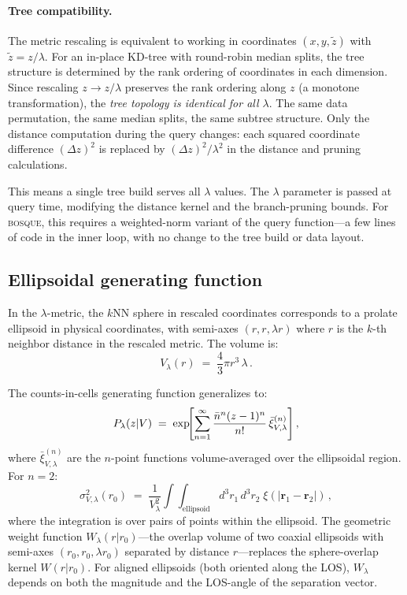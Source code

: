 \paragraph{Tree compatibility.}  The metric rescaling is equivalent to working in coordinates $(x, y, \tilde{z})$ with $\tilde{z} = z/\lambda$.  For an in-place KD-tree with round-robin median splits, the tree structure is determined by the rank ordering of coordinates in each dimension.  Since rescaling $z \to z/\lambda$ preserves the rank ordering along $z$ (a monotone transformation), the \emph{tree topology is identical for all $\lambda$}.  The same data permutation, the same median splits, the same subtree structure.  Only the distance computation during the query changes: each squared coordinate difference $(\Delta z)^2$ is replaced by $(\Delta z)^2/\lambda^2$ in the distance and pruning calculations.

This means a single tree build serves all $\lambda$ values.  The $\lambda$ parameter is passed at query time, modifying the distance kernel and the branch-pruning bounds.  For \textsc{bosque}, this requires a weighted-norm variant of the query function---a few lines of code in the inner loop, with no change to the tree build or data layout.

\subsection{Ellipsoidal generating function}
\label{sec:ellipsoidal_genfunc}

In the $\lambda$-metric, the $k$NN sphere in rescaled coordinates corresponds to a prolate ellipsoid in physical coordinates, with semi-axes $(r, r, \lambda r)$ where $r$ is the $k$-th neighbor distance in the rescaled metric.  The volume is:
\begin{equation}
  V_\lambda(r) \;=\; \frac{4}{3}\pi r^3\,\lambda\,.
  \label{eq:V_ellipsoid}
\end{equation}

The counts-in-cells generating function generalizes to:
\begin{equation}
  P_\lambda(z|V) \;=\; \exp\!\Biggl[\sum_{n=1}^{\infty}\frac{\bar{n}^n(z-1)^n}{n!}\,\bar{\xi}^{(n)}_{V,\lambda}\Biggr]\,,
  \label{eq:genfunc_lambda}
\end{equation}
where $\bar{\xi}^{(n)}_{V,\lambda}$ are the $n$-point functions volume-averaged over the ellipsoidal region.  For $n = 2$:
\begin{equation}
  \sigma^2_{V,\lambda}(r_0) \;=\; \frac{1}{V_\lambda^2}\int\!\!\int_{\mathrm{ellipsoid}} d^3r_1\,d^3r_2\;\xi(|\mathbf{r}_1 - \mathbf{r}_2|)\,,
  \label{eq:sigmaV_lambda}
\end{equation}
where the integration is over pairs of points within the ellipsoid.  The geometric weight function $W_\lambda(r|r_0)$---the overlap volume of two coaxial ellipsoids with semi-axes $(r_0, r_0, \lambda r_0)$ separated by distance $r$---replaces the sphere-overlap kernel $W(r|r_0)$.  For aligned ellipsoids (both oriented along the LOS), $W_\lambda$ depends on both the magnitude and the LOS-angle of the separation vector.

